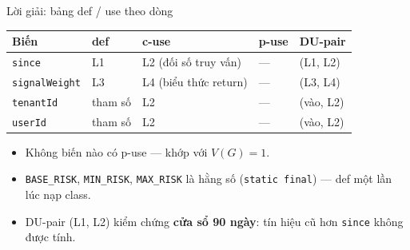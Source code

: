\documentclass[aspectratio=169,12pt]{beamer}
\begin{document}
\begin{frame}{Lời giải: bảng def / use theo dòng}
  \begin{center}
  \footnotesize
  \setlength{\tabcolsep}{4pt}
  \begin{tabular}{lllll}
    \toprule
    \textbf{Biến} & \textbf{def} & \textbf{c-use} & \textbf{p-use} & \textbf{DU-pair} \\
    \midrule
    \texttt{since}        & L1 & L2 (đối số truy vấn) & --- & (L1, L2) \\
    \texttt{signalWeight} & L3 & L4 (biểu thức return) & --- & (L3, L4) \\
    \texttt{tenantId}     & tham số & L2 & --- & (vào, L2) \\
    \texttt{userId}       & tham số & L2 & --- & (vào, L2) \\
    \bottomrule
  \end{tabular}
  \end{center}

  \vspace{0.3em}
  \begin{itemize}
    \item Không biến nào có p-use --- khớp với $V(G) = 1$.
    \item \texttt{BASE\_RISK}, \texttt{MIN\_RISK}, \texttt{MAX\_RISK}
          là hằng số (\texttt{static final}) --- def một lần lúc nạp class.
    \item DU-pair (L1, L2) kiểm chứng \textbf{cửa sổ 90 ngày}:
          tín hiệu cũ hơn \texttt{since} không được tính.
  \end{itemize}
\end{frame}
\end{document}

